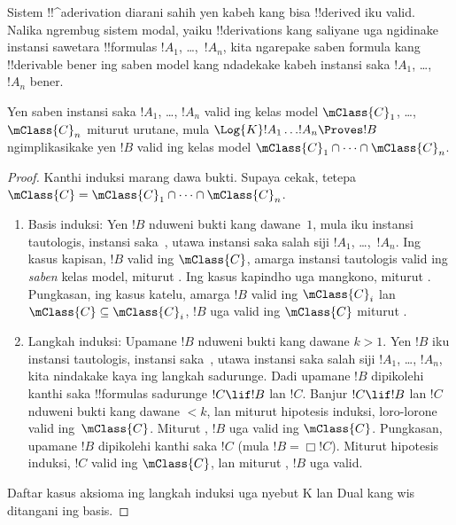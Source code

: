 \documentclass[../../../include/open-logic-section]{subfiles}
\begin{document}


Sistem !!^a{derivation} diarani sahih yen kabeh kang bisa
!!{derive}d iku valid. Nalika ngrembug sistem modal, yaiku
!!{derivation}s kang saliyane  uga ngidinake instansi sawetara
!!{formula}s $!A_1$, \dots,~$!A_n$, kita ngarepake saben formula
kang !!{derivable} bener ing saben model kang ndadekake kabeh instansi saka $!A_1$,
\dots, $!A_n$ bener.

\begin{thm}
  Yen saben instansi saka $!A_1$, \dots, $!A_n$ valid ing
  kelas model $\mClass{C}_1$, \dots, $\mClass{C}_n$
  miturut urutane, mula $\Log{K}!A_1\dots !A_n
  \Proves !B$ ngimplikasikake yen $!B$ valid ing kelas
  model $\mClass{C}_1 \cap \dots \cap \mClass{C}_n$.
\end{thm}

\begin{proof}
  Kanthi induksi marang dawa bukti. Supaya cekak, tetepa $\mClass{C} =
  \mClass{C}_1 \cap \dots \cap \mClass{C}_n$.
  \begin{enumerate}
  \item Basis induksi: Yen $!B$ nduweni bukti kang dawane~$1$, mula
    iku instansi tautologis, instansi
    saka~, utawa instansi
    saka salah siji $!A_1$, \dots,~$!A_n$. Ing kasus kapisan, $!B$
    valid ing $\mClass{C}$, amarga instansi tautologis valid ing
    \emph{saben} kelas model, miturut .
    Ing kasus kapindho uga mangkono, miturut
    . Pungkasan, ing kasus katelu,
    amarga $!B$ valid ing $\mClass{C}_i$ lan $\mClass{C} \subseteq
    \mClass{C}_i$, $!B$ uga valid ing $\mClass{C}$ miturut
    .
  \item Langkah induksi: Upamane $!B$ nduweni bukti kang dawane $k>1$. Yen
    $!B$ iku instansi tautologis, instansi saka~, utawa instansi saka salah siji $!A_1$,
    \dots, $!A_n$, kita nindakake kaya ing langkah sadurunge. Dadi upamane $!B$
    dipikolehi kanthi \MP{} saka !!{formula}s sadurunge $!C \lif !B$ lan
    $!C$. Banjur $!C \lif !B$ lan $!C$ nduweni bukti kang dawane $<k$, lan
    miturut hipotesis induksi, loro-lorone valid ing~$\mClass{C}$. Miturut
    , $!B$ uga valid ing $\mClass{C}$.
    Pungkasan, upamane $!B$ dipikolehi kanthi \Nec{} saka $!C$ (mula
    $!B = \Box!C$). Miturut hipotesis induksi, $!C$ valid ing
    $\mClass{C}$, lan miturut , $!B$
    uga valid.
  \end{enumerate}
Daftar kasus aksioma ing langkah induksi uga nyebut K lan Dual kang wis ditangani ing basis.
\end{proof}
\end{document}
